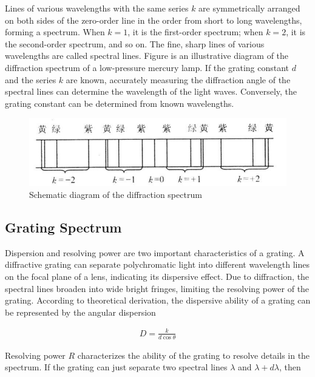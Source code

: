 \documentclass[UTF8]{article}
\begin{document}
   Lines of various wavelengths with the same series $k$ are symmetrically arranged on both sides of the zero-order line in the order from short to long wavelengths, forming a spectrum. When $k = 1$, it is the first-order spectrum; when $k = 2$, it is the second-order spectrum, and so on. The fine, sharp lines of various wavelengths are called spectral lines. Figure is an illustrative diagram of the diffraction spectrum of a low-pressure mercury lamp. If the grating constant $d$ and the series $k$ are known, accurately measuring the diffraction angle of the spectral lines can determine the wavelength of the light waves. Conversely, the grating constant can be determined from known wavelengths.
   
   \begin{figure}[H]
   	    	\centering
   	    	\includegraphics[clip,scale=1,trim={0 0 0 0}]{fig/fig4.png}
   	        \caption{Schematic diagram of the diffraction spectrum}
   	        \label{figure.1}
       \end{figure}  
  
  \subsection{Grating Spectrum}
  
  Dispersion and resolving power are two important characteristics of a grating. A diffractive grating can separate polychromatic light into different wavelength lines on the focal plane of a lens, indicating its dispersive effect. Due to diffraction, the spectral lines broaden into wide bright fringes, limiting the resolving power of the grating. According to theoretical derivation, the dispersive ability of a grating can be represented by the angular dispersion 
  
  \begin{eqnarray}
  D = \frac{k}{d \cos \theta}
  \end{eqnarray}
      
     Resolving power $R$ characterizes the ability of the grating to resolve details in the spectrum. If the grating can just separate two spectral lines $\lambda$ and $\lambda + d\lambda$, then 
     
\end{document}
